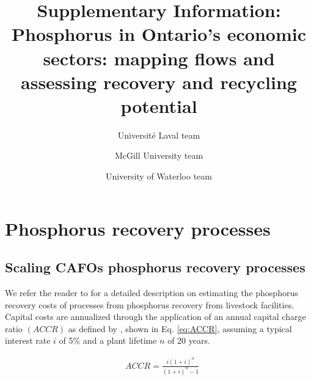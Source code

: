 \documentclass[authoryear]{elsarticle}
\begin{document}
	\begin{frontmatter}
		\title{
			Supplementary Information: \\ Phosphorus in Ontario's economic sectors: mapping flows and assessing recovery and recycling potential
		}
		
		\author[ULaval]{Université Laval team}
		\author[McGill]{McGill University team}
		\author[Waterloo]{University of Waterloo team}
		
		\address[ULaval]{Université Laval}
		\address[McGill]{McGill University}
		\address[Waterloo]{University of Waterloo}
		
%			
	\end{frontmatter}
	
	\tableofcontents
\section{Phosphorus recovery processes}	
\subsection{Scaling CAFOs phosphorus recovery processes}
We refer the reader to \citet{martin2021geospatial} for a detailed description on estimating the phosphorus recovery costs of processes from phosphorus recovery from livestock facilities. Capital costs are annualized through the application of an annual capital charge ratio $\left( ACCR\right)$ as defined by \citet{towler2013chemical}, shown in Eq. \ref{eq:ACCR}, assuming a typical interest rate $i$ of 5\% and a plant lifetime $n$ of 20 years.

\begin{align}
	& ACCR = \frac{i\left( 1 + i\right)^n }{\left(1+i \right)^n -1 } \label{eq:ACCR}
\end{align}
\end{document}
